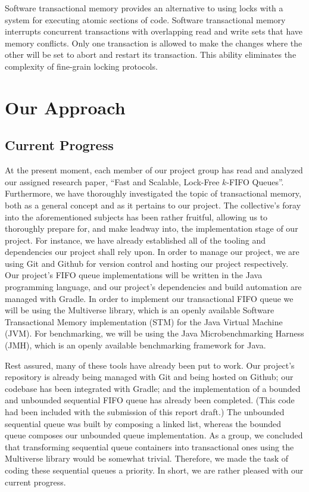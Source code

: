 \documentclass[a4paper, 10pt, conference]{ieeeconf}  %
\begin{document}
Software transactional memory provides an alternative to using locks with a system for executing atomic sections of code. Software transactional memory interrupts concurrent transactions with overlapping read and write sets that have memory conflicts. Only one transaction is allowed to make the changes where the other will be set to abort and restart its transaction. This ability eliminates the complexity of fine-grain locking protocols. \cite{1}

\section{Our Approach}

\subsection{Current Progress}
At the present moment, each member of our project group has read and analyzed our assigned research paper, “Fast and Scalable, Lock-Free $k$-FIFO Queues”. Furthermore, we have thoroughly investigated the topic of transactional memory, both as a general concept and as it pertains to our project. The collective’s foray into the aforementioned subjects has been rather fruitful, allowing us to thoroughly prepare for, and make leadway into, the implementation stage of our project. For instance, we have already established all of the tooling and dependencies our project shall rely upon. 
In order to manage our project, we are using Git and Github for version control and hosting our project respectively. Our project’s FIFO queue implementations will be written in the Java programming language, and our project’s dependencies and build automation are managed with Gradle. In order to implement our transactional FIFO queue we will be using the Multiverse library, which is an openly available Software Transactional Memory implementation (STM) for the Java Virtual Machine (JVM). For benchmarking, we will be using the Java Microbenchmarking Harness (JMH), which is an openly available benchmarking framework for Java.

Rest assured, many of these tools have already been put to work. Our project’s repository is already being managed with Git and being hosted on Github; our codebase has been integrated with Gradle; and the implementation of a bounded and unbounded sequential FIFO queue has already been completed. (This code had been included with the submission of this report draft.) The unbounded sequential queue was built by composing a linked list, whereas the bounded queue composes our unbounded queue implementation. As a group, we concluded that transforming sequential queue containers into transactional ones using the Multiverse library would be somewhat trivial. Therefore, we made the task of coding these sequential queues a priority. In short, we are rather pleased with our current progress.
\end{document}
